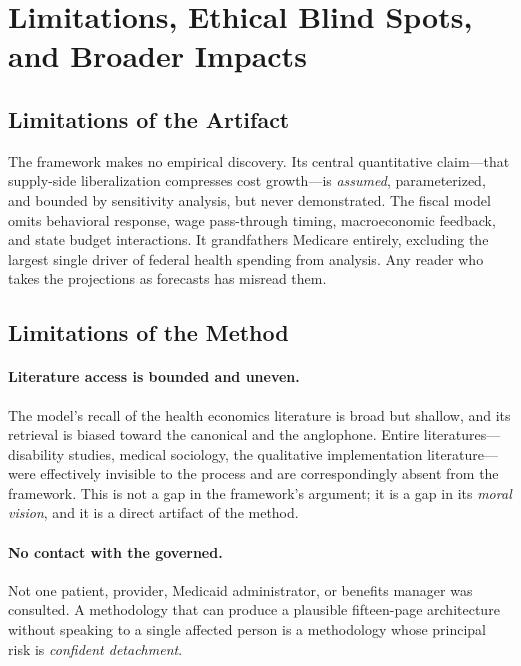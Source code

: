 \documentclass[11pt,a4paper]{article}
\begin{document}
\section{Limitations, Ethical Blind Spots, and Broader Impacts}
\label{sec:limits}

\subsection{Limitations of the Artifact}

The framework makes no empirical discovery. Its central quantitative claim---that supply-side liberalization compresses cost growth---is \emph{assumed}, parameterized, and bounded by sensitivity analysis, but never demonstrated. The fiscal model omits behavioral response, wage pass-through timing, macroeconomic feedback, and state budget interactions. It grandfathers Medicare entirely, excluding the largest single driver of federal health spending from analysis. Any reader who takes the projections as forecasts has misread them.

\subsection{Limitations of the Method}

\paragraph{Literature access is bounded and uneven.} The model's recall of the health economics literature is broad but shallow, and its retrieval is biased toward the canonical and the anglophone. Entire literatures---disability studies, medical sociology, the qualitative implementation literature---were effectively invisible to the process and are correspondingly absent from the framework. This is not a gap in the framework's argument; it is a gap in its \emph{moral vision}, and it is a direct artifact of the method.

\paragraph{No contact with the governed.} Not one patient, provider, Medicaid administrator, or benefits manager was consulted. A methodology that can produce a plausible fifteen-page architecture without speaking to a single affected person is a methodology whose principal risk is \emph{confident detachment}.
\end{document}
